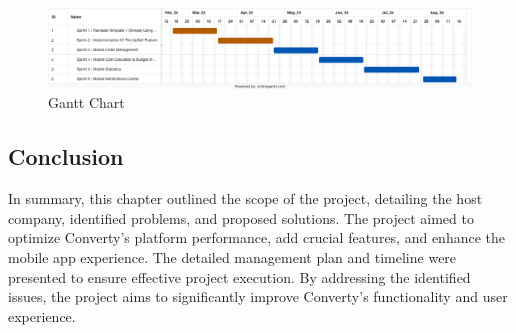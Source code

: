 \begin{figure}[H]
  \centering
  \includegraphics[width=1\textwidth]{Images/Online Gantt 20240715.png}
  \caption{Gantt Chart}
  \label{fig:Gantt Chart}
\end{figure}

\subsection{Conclusion}
In summary, this chapter outlined the scope of the project, detailing the host company, identified problems, and proposed solutions. The project aimed to optimize Converty's platform performance, add crucial features, and enhance the mobile app experience. The detailed management plan and timeline were presented to ensure effective project execution. By addressing the identified issues, the project aims to significantly improve Converty's functionality and user experience.